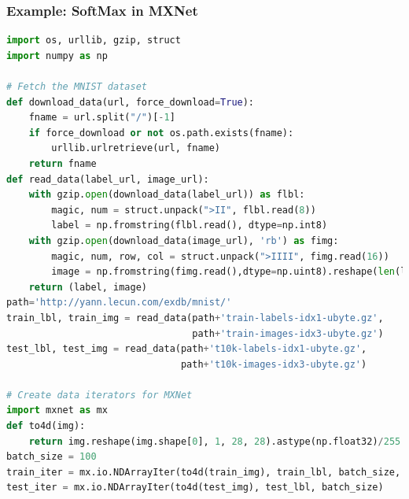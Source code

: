 \begin{frame}[fragile]
  \MyLogo
  \frametitle{Example: SoftMax in MXNet}  

\begin{lstlisting}[language=python]
import os, urllib, gzip, struct
import numpy as np

# Fetch the MNIST dataset
def download_data(url, force_download=True): 
	fname = url.split("/")[-1]
	if force_download or not os.path.exists(fname):
		urllib.urlretrieve(url, fname)
	return fname
def read_data(label_url, image_url):
	with gzip.open(download_data(label_url)) as flbl:
		magic, num = struct.unpack(">II", flbl.read(8))
		label = np.fromstring(flbl.read(), dtype=np.int8)
	with gzip.open(download_data(image_url), 'rb') as fimg:
		magic, num, row, col = struct.unpack(">IIII", fimg.read(16))
		image = np.fromstring(fimg.read(),dtype=np.uint8).reshape(len(label),row,col)
	return (label, image)
path='http://yann.lecun.com/exdb/mnist/'
train_lbl, train_img = read_data(path+'train-labels-idx1-ubyte.gz',
								 path+'train-images-idx3-ubyte.gz')
test_lbl, test_img = read_data(path+'t10k-labels-idx1-ubyte.gz',
							   path+'t10k-images-idx3-ubyte.gz')

# Create data iterators for MXNet
import mxnet as mx
def to4d(img):
	return img.reshape(img.shape[0], 1, 28, 28).astype(np.float32)/255
batch_size = 100
train_iter = mx.io.NDArrayIter(to4d(train_img), train_lbl, batch_size, shuffle=True)
test_iter = mx.io.NDArrayIter(to4d(test_img), test_lbl, batch_size)

\end{lstlisting}

\end{frame}



